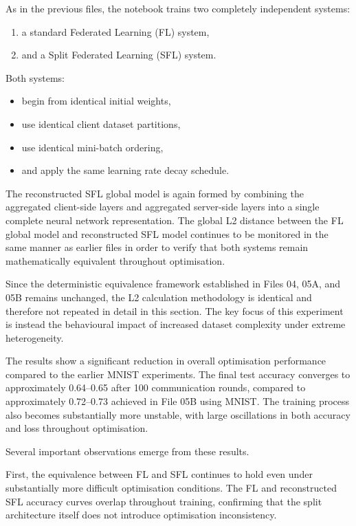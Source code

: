 As in the previous files, the notebook trains two completely independent systems:
\begin{enumerate}
    \item a standard Federated Learning (FL) system,
    \item and a Split Federated Learning (SFL) system.
\end{enumerate}

Both systems:
\begin{itemize}
    \item begin from identical initial weights,
    \item use identical client dataset partitions,
    \item use identical mini-batch ordering,
    \item and apply the same learning rate decay schedule.
\end{itemize}

The reconstructed SFL global model is again formed by combining the aggregated client-side layers and aggregated server-side layers into a single complete neural network representation. The global L2 distance between the FL global model and reconstructed SFL model continues to be monitored in the same manner as earlier files in order to verify that both systems remain mathematically equivalent throughout optimisation.

Since the deterministic equivalence framework established in Files 04, 05A, and 05B remains unchanged, the L2 calculation methodology is identical and therefore not repeated in detail in this section. The key focus of this experiment is instead the behavioural impact of increased dataset complexity under extreme heterogeneity.

The results show a significant reduction in overall optimisation performance compared to the earlier MNIST experiments. The final test accuracy converges to approximately 0.64--0.65 after 100 communication rounds, compared to approximately 0.72--0.73 achieved in File 05B using MNIST. The training process also becomes substantially more unstable, with large oscillations in both accuracy and loss throughout optimisation.

Several important observations emerge from these results.

First, the equivalence between FL and SFL continues to hold even under substantially more difficult optimisation conditions. The FL and reconstructed SFL accuracy curves overlap throughout training, confirming that the split architecture itself does not introduce optimisation inconsistency.

